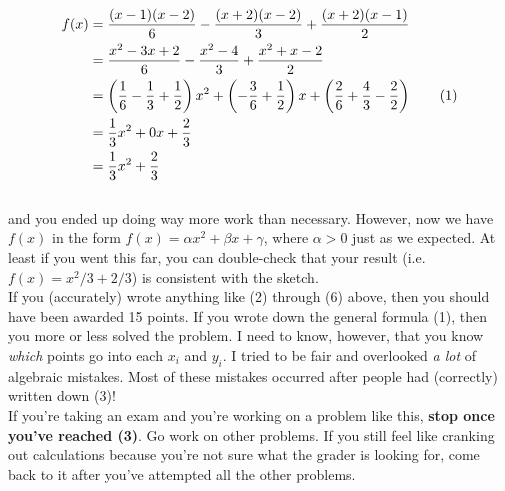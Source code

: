\documentclass{article}
\newcommand\numberthis{\addtocounter{equation}{1}\tag{\theequation}}
\def\a{\alpha}
\def\b{\beta}
\def\c{\gamma}
\begin{document}
\begin{align*}
f(x)  &=  \frac{(x - 1)(x - 2)}{6} -  \frac{(x + 2)(x - 2)}{3} + \frac{(x + 2)(x - 1)}{2} \\
&= \frac{x^2 - 3 x +2}{6} - \frac{x^2  - 4}{3} + \frac{x^2 + x - 2}{2} \\
&= \left( \frac{1}{6} - \frac{1}{3} + \frac{1}{2} \right) x^2 + \left( -\frac{3}{6} + \frac{1}{2} \right) x + \left( \frac{2}{6} + \frac{4}{3} - \frac{2}{2} \right) \numberthis \\
&= \frac{1}{3} x^2 + 0 x + \frac{2}{3} \\
&= \frac{1}{3} x^2 + \frac{2}{3} 
\end{align*}\\

{\setlength{\parindent}{0cm}
and you ended up doing way more work than necessary. However, now we have $f(x)$ in the form $f(x) = \a x^2 + \b x + \c$, where $\a > 0$ just as we expected. At least if you went this far, you can double-check that your result (i.e. $f(x) = x^2 / 3 + 2 / 3$) is consistent with the sketch. }\\

If you (accurately) wrote anything like (2) through (6) above, then you should have been awarded 15 points. If you wrote down the general formula (1), then you more or less solved the problem. I need to know, however, that you know \textit{which} points go into each $x_i$ and $y_i$. I tried to be fair and overlooked \textit{a lot} of algebraic mistakes. Most of these mistakes occurred after people had (correctly) written down (3)! \\

If you're taking an exam and you're working on a problem like this, \textbf{stop once you've reached (3)}. Go work on other problems. If you still feel like cranking out calculations because you're not sure what the grader is looking for, come back to it after you've attempted all the other problems. 
\end{document}
